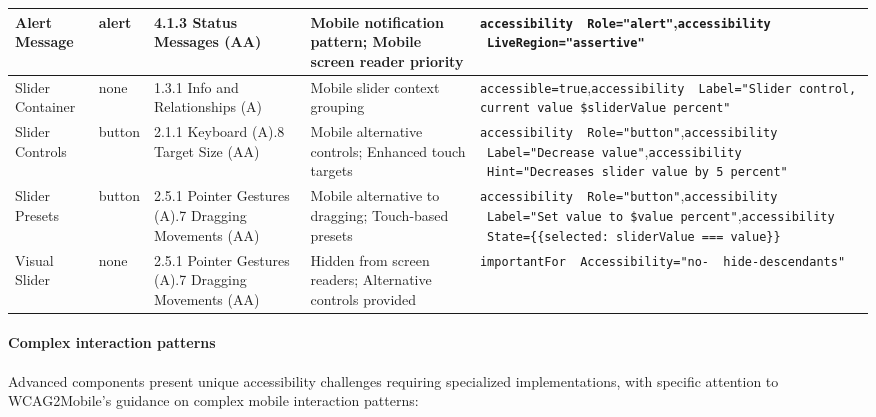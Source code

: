 \begin{longtable}[c]{|C{2.5cm}|C{2cm}|C{2.8cm}|C{2.8cm}|C{4.7cm}|}
\hline
Alert Message & alert & 4.1.3 Status Messages (AA) & Mobile notification pattern; Mobile screen reader priority & \texttt{accessibility \ Role="alert"},\newline \texttt{accessibility \ LiveRegion="assertive"} \\
\hline
Slider Container & none & 1.3.1 Info and Relationships (A) & Mobile slider context grouping & \texttt{accessible=true},\newline \texttt{accessibility \ Label="Slider control, current value \${sliderValue} percent"} \\
\hline
Slider Controls & button & 2.1.1 Keyboard (A).8 Target Size (AA) & Mobile alternative controls; Enhanced touch targets & \texttt{accessibility \ Role="button"},\newline \texttt{accessibility \ Label="Decrease value"},\newline \texttt{accessibility \ Hint="Decreases slider value by 5 percent"} \\
\hline
Slider Presets & button & 2.5.1 Pointer Gestures (A).7 Dragging Movements (AA) & Mobile alternative to dragging; Touch-based presets & \texttt{accessibility \ Role="button"},\newline \texttt{accessibility \ Label="Set value to \${value} percent"},\newline \texttt{accessibility \ State=\{\{selected: sliderValue === value\}\}} \\
\hline
Visual Slider & none & 2.5.1 Pointer Gestures (A).7 Dragging Movements (AA) & Hidden from screen readers; Alternative controls provided & \texttt{importantFor \ Accessibility="no- \ hide-descendants"} \\
\end{longtable}
\FloatBarrier

\paragraph{Complex interaction patterns}

Advanced components present unique accessibility challenges requiring specialized implementations, with specific attention to WCAG2Mobile's guidance on complex mobile interaction patterns:

